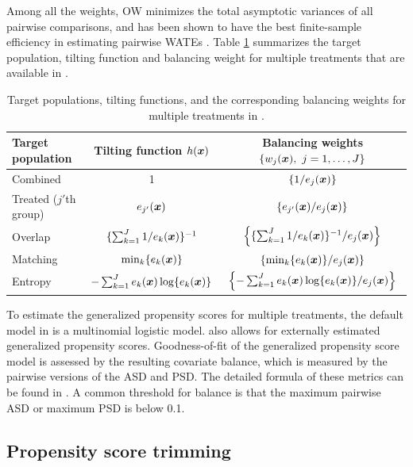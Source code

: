 Among all the weights, OW minimizes the total asymptotic variances of all pairwise comparisons, and has been shown to have the best finite-sample efficiency in estimating pairwise WATEs \citep{li2019propensity}.  Table \ref{tab:weight_multi} summarizes the target population, tilting function and balancing weight for multiple treatments that are available in .  

 

\begin{table}[htbp]
\centering
\caption{Target populations, tilting functions, and the corresponding balancing weights for multiple treatments in .}\label{tab:weight_multi}
{\footnotesize
\begin{tabular}{lcc}
\toprule
 Target population & Tilting function $h(\bm{x})$ & Balancing weights $\left\{w_j(\bm{x}),~j=1,\ldots,J\right\}$\\\midrule
Combined & 1 & $\left\{1/e_j(\bm{x})\right\}$\\
Treated ($j'$th group) & $e_{j'}(\bm{x})$ & $\left\{e_{j'}(\bm{x})/e_j(\bm{x})\right\}$ \\
Overlap & $\{\sum_{k=1}^J  1/e_k(\bm{x})\}^{-1}$ & $\left\{\{\sum_{k=1}^J  1/e_k(\bm{x})\}^{-1}/e_j(\bm{x})\right\}$\\
Matching &$\min_k \{e_k(\bm{x})\}$  & $\left\{ \min_k \{e_k(\bm{x})\}/e_j(\bm{x}) \right\}$ \\
Entropy  &$-\sum_{k=1}^J e_k(\bm{x})\log\{e_k(\bm{x})\}$ & $\left\{-\sum_{k=1}^J e_k(\bm{x})\log\{e_k(\bm{x})\}/ e_j(\bm{x}) \right\}$ \\
\bottomrule
\end{tabular}}
\end{table}

 
To estimate the generalized propensity scores for multiple treatments, the default model in  is a multinomial logistic model.  also allows for externally estimated generalized propensity scores. Goodness-of-fit of the generalized propensity score model is assessed by the resulting covariate balance, which is measured by the pairwise versions of the ASD and PSD. The detailed formula of these metrics can be found in \cite{li2019propensity}. A common threshold for balance is that the maximum pairwise ASD or maximum PSD is below 0.1.  
\subsection{Propensity score trimming}


